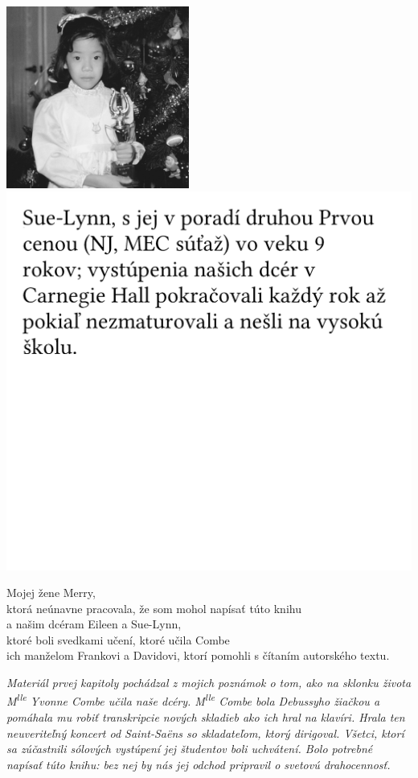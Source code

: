 \documentclass[11pt,a4paper]{book}
\begin{document}
\includegraphics[width=6cm]{figures/Sue.jpg} \includegraphics[scale=0.15]{figures/SueTextSK.png}\\
\newpage
\begin{center}
Mojej žene Merry,\\
ktorá neúnavne pracovala, že som mohol napísať túto knihu
\vspace*{1em}\\
a našim dcéram Eileen a Sue-Lynn,\\
ktoré boli svedkami učení, ktoré učila Combe\\
ich manželom Frankovi a Davidovi, ktorí pomohli s čítaním autorského textu. 
\vspace*{3em}\\
\end{center}
\textit{Materiál prvej kapitoly pochádzal z mojich poznámok o tom, ako na sklonku života M\textsuperscript{lle} Yvonne Combe učila naše dcéry. M\textsuperscript{lle} Combe bola Debussyho žiačkou a pomáhala mu robiť transkripcie nových skladieb ako ich hral na klavíri. Hrala ten neuveriteľný koncert od Saint-Saëns so skladateľom, ktorý dirigoval. Všetci, ktorí sa zúčastnili sólových vystúpení jej študentov boli uchvátení. Bolo potrebné napísať túto knihu: bez nej by nás jej odchod pripravil o svetovú drahocennosť.}
\end{document}
